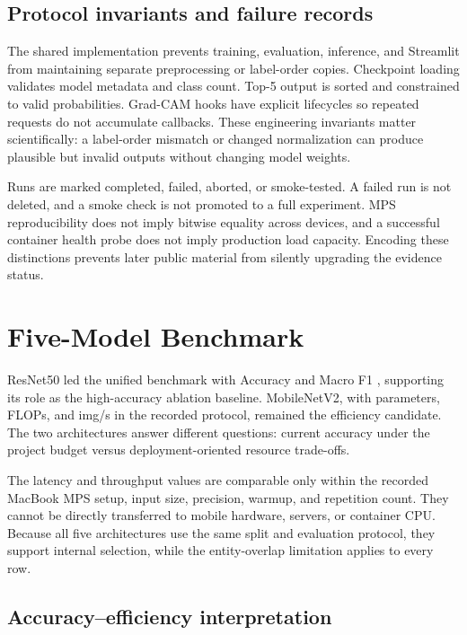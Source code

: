 \documentclass[11pt]{article}
\begin{document}
\subsection*{Protocol invariants and failure records}

The shared implementation prevents training, evaluation, inference, and Streamlit from maintaining separate preprocessing or label-order copies. Checkpoint loading validates model metadata and class count. Top-5 output is sorted and constrained to valid probabilities. Grad-CAM hooks have explicit lifecycles so repeated requests do not accumulate callbacks. These engineering invariants matter scientifically: a label-order mismatch or changed normalization can produce plausible but invalid outputs without changing model weights.

Runs are marked completed, failed, aborted, or smoke-tested. A failed run is not deleted, and a smoke check is not promoted to a full experiment. MPS reproducibility does not imply bitwise equality across devices, and a successful container health probe does not imply production load capacity. Encoding these distinctions prevents later public material from silently upgrading the evidence status.

\section{Five-Model Benchmark}



ResNet50 led the unified benchmark with Accuracy \PDAWeekTwoAccuracy{} and Macro F1 \PDAWeekTwoMacroFOne{}, supporting its role as the high-accuracy ablation baseline. MobileNetV2, with \PDAMobileParams{} parameters, \PDAMobileFlops{} FLOPs, and \PDAMobileThroughput{} img/s in the recorded protocol, remained the efficiency candidate. The two architectures answer different questions: current accuracy under the project budget versus deployment-oriented resource trade-offs.

The latency and throughput values are comparable only within the recorded MacBook MPS setup, input size, precision, warmup, and repetition count. They cannot be directly transferred to mobile hardware, servers, or container CPU. Because all five architectures use the same split and evaluation protocol, they support internal selection, while the entity-overlap limitation applies to every row.

\subsection*{Accuracy--efficiency interpretation}
\end{document}
